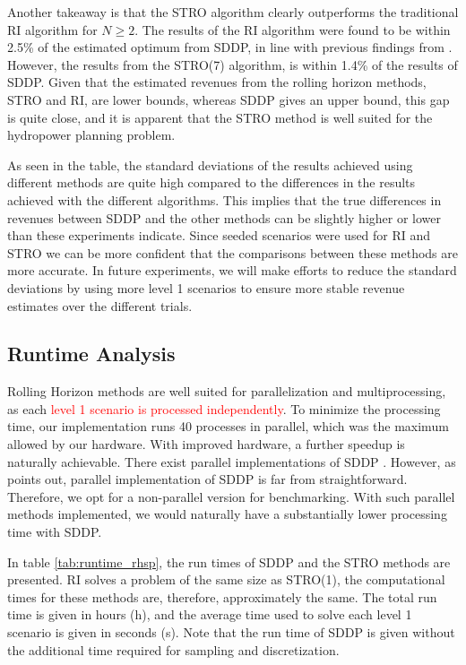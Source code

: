 Another takeaway is that the STRO algorithm clearly outperforms the traditional RI algorithm for $N \geq 2$. The results of the RI algorithm were found to be within 2.5\% of the estimated optimum from SDDP, in line with previous findings from \cite{braaten2016a}. However, the results from the STRO(7) algorithm, is within 1.4\% of the results of SDDP. Given that the estimated revenues from the rolling horizon methods, STRO and RI, are lower bounds, whereas SDDP gives an upper bound, this gap is quite close, and it is apparent that the STRO method is well suited for the hydropower planning problem. 



As seen in the table, the standard deviations of the results achieved using different methods are quite high compared to the differences in the results achieved with the different algorithms. This implies that the true differences in revenues between SDDP and the other methods can be  slightly higher or lower than these experiments indicate. Since seeded scenarios were used for RI and STRO we can be more confident that the comparisons between these methods are more accurate. In future experiments, we will make efforts to reduce the standard deviations by using more level 1 scenarios to ensure more stable revenue estimates over the different trials. 





\subsection{Runtime Analysis}
Rolling Horizon methods are well suited for parallelization and multiprocessing, as each \textcolor{red}{level 1 scenario is processed independently}. To minimize the processing time, our implementation runs 40 processes in parallel, which was the maximum allowed by our hardware. With improved hardware, a further speedup is naturally achievable. There exist parallel implementations of SDDP \cite{AvPL21,PintoBorges2013,EdsonErlon2003}. However, as \cite{AvPL21} points out, parallel implementation of SDDP is far from straightforward. Therefore, we opt for a non-parallel version for benchmarking. With such parallel methods implemented, we would naturally have a substantially lower processing time with SDDP. 

In table \ref{tab:runtime_rhsp}, the run times of SDDP and the STRO methods are presented. RI solves a problem of the same size as STRO(1), the computational times for these methods are, therefore, approximately the same. The total run time is given in hours (h), and the average time used to solve each level 1 scenario is given in seconds (s). Note that the run time of SDDP is given without the additional time required for sampling and discretization.  

